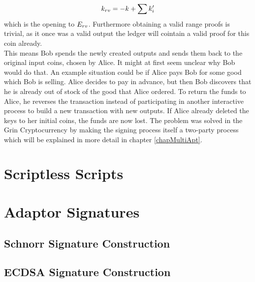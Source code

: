 \[ k_{rv} = -k + \sum{k'_i} \]
which is the opening to $E_{rv}$. Furthermore obtaining a valid range proofs is trivial, as it once was a valid output the ledger will cointain a valid proof for this coin already. \\
This means Bob spends the newly created outputs and sends them back to the original input coins, chosen by Alice. It might at first seem unclear why Bob would do that. An example situation could be if Alice
pays Bob for some good which Bob is selling. Alice decides to pay in advance, but then Bob discovers that he is already out of stock of the good that Alice ordered. To return the funds to Alice, he reverses
the transaction instead of participating in another interactive process to build a new transaction with new outputs. If Alice already deleted the keys to her initial coins, the funds are now lost.
The problem was solved in the Grin Cryptocurrency by making the signing process itself a two-party process which will be explained in more detail in chapter \ref{chapMultiApt}. 

\section{Scriptless Scripts}\label{secScriptless}
\section{Adaptor Signatures}\label{secApt}
\subsection{Schnorr Signature Construction}\label{secAptSchnorr}
\subsection{ECDSA Signature Construction}\label{secAptECDSA}
